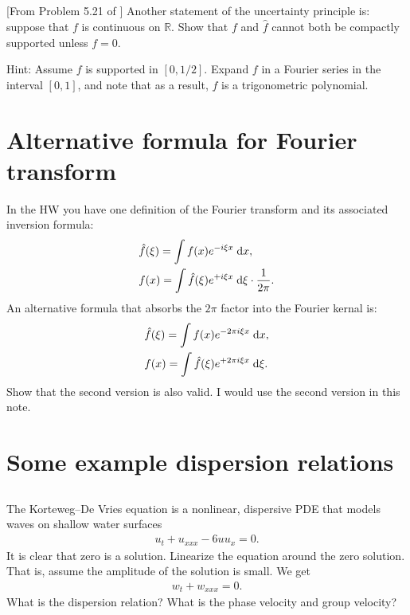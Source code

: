 \documentclass[11pt,letterpaper]{report}
\begin{document}
\subsection{}
[From Problem 5.21 of \cite{SteinShakarchi_03}] Another statement of the uncertainty principle is: suppose that $f$ is continuous on $\mathbb{R}$. Show that $f$ and $\hat f$ cannot both be compactly supported unless $f = 0$. 

Hint: Assume $f$ is supported in $[0, 1/2]$. Expand $f$ in a Fourier series in the
interval $[0, 1]$, and note that as a result, $f$ is a trigonometric polynomial.

\section{Alternative formula for Fourier transform}
In the HW you have one definition of the Fourier transform and its associated inversion formula:
\begin{align}
    &\hat f(\xi) = \int f(x)e^{-i\xi x} \;\mathrm{d} x,\\
    &f(x) = \int \hat f(\xi)e^{+i\xi x} \;\mathrm{d} \xi \cdot\frac{1}{2\pi}.
\end{align}
An alternative formula that absorbs the $2\pi$ factor into the Fourier kernal is:
\begin{align}
    &\hat f(\xi ) = \int f(x)e^{-2\pi i\xi x} \;\mathrm{d} x,\\
    &f(x) = \int \hat f(\xi)e^{+2\pi i \xi x} \;\mathrm{d} \xi \label{eq:Four_inv}.
\end{align}
Show that the second version is also valid. I would use the second version in this note.

\section{Some example dispersion relations}
\subsection{}
The Korteweg–De Vries equation is a nonlinear, dispersive PDE that models waves on shallow water surfaces
\begin{align}
    u_t+u_{xxx}-6uu_x = 0.
\end{align}
It is clear that zero is a solution. Linearize the equation around the zero solution. That is, assume the amplitude of the solution is small. We get
\begin{align}
    w_t+w_{xxx} = 0.
\end{align}
What is the dispersion relation? What is the phase velocity and group velocity?
\end{document}
